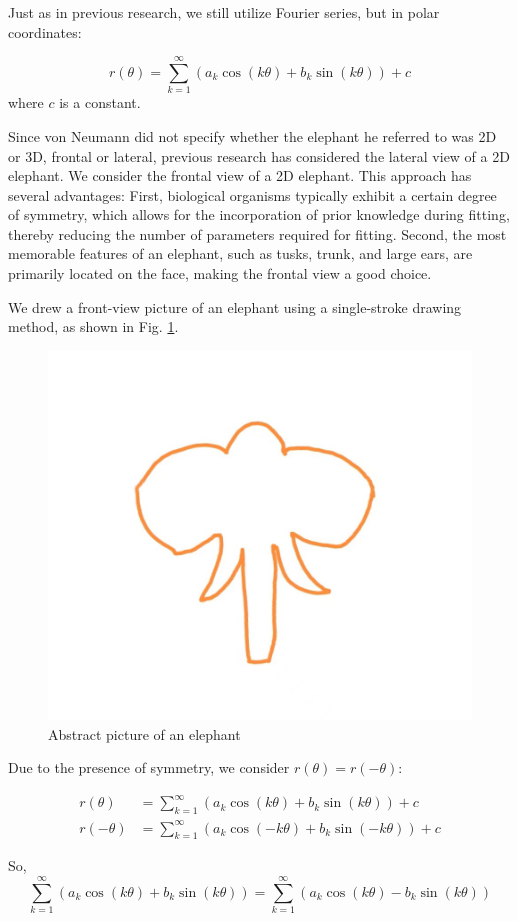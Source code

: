 \documentclass{article}
\begin{document}
Just as in previous research, we still utilize Fourier series, but in polar coordinates:

$$
r(\theta) = \sum_{k=1}^{\infty} \left( a_k \cos(k\theta) + b_k \sin(k\theta) \right) + c
$$
where $c$ is a constant.


Since von Neumann did not specify whether the elephant he referred to was 2D or 3D, frontal or lateral, previous research has considered the lateral view of a 2D elephant. We consider the frontal view of a 2D elephant. This approach has several advantages: First, biological organisms typically exhibit a certain degree of symmetry, which allows for the incorporation of prior knowledge during fitting, thereby reducing the number of parameters required for fitting. Second, the most memorable features of an elephant, such as tusks, trunk, and large ears, are primarily located on the face, making the frontal view a good choice.

We drew a front-view picture of an elephant using a single-stroke drawing method, as shown in Fig. \ref{fig:elephant}.


\begin{figure}[h]
	\centering
	\includegraphics[width=0.6\linewidth]{elephant.jpg}
	\caption{Abstract picture of an elephant}
	\label{fig:elephant}
\end{figure}


Due to the presence of symmetry, we consider \( r(\theta) = r(-\theta) \):

\begin{align*}
	r(\theta) &= \sum_{k=1}^{\infty} \left( a_k \cos(k\theta) + b_k \sin(k\theta) \right) + c \\
	r(-\theta) &= \sum_{k=1}^{\infty} \left( a_k \cos(-k\theta) + b_k \sin(-k\theta) \right) + c
\end{align*}


So,
$$
\sum_{k=1}^{\infty} \left( a_k \cos(k\theta) + b_k \sin(k\theta) \right) = \sum_{k=1}^{\infty} \left( a_k \cos(k\theta) - b_k \sin(k\theta) \right)
$$
\end{document}
